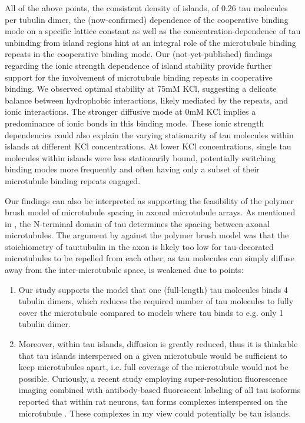 All of the above points, the consistent density of islands, of 0.26 tau molecules per tubulin dimer, the (now-confirmed) dependence of the cooperative binding mode on a specific lattice constant \parencite{siahaan2022microtubule} as well as the concentration-dependence of tau unbinding from island regions hint at an integral role of the microtubule binding repeats in the cooperative binding mode. Our (not-yet-published) findings regarding the ionic strength dependence of island stability  provide further support for the involvement of microtubule binding repeats in cooperative binding. We observed optimal stability at 75mM KCl, suggesting a delicate balance between hydrophobic interactions, likely mediated by the repeats, and ionic interactions. The stronger diffusive mode at 0mM KCl implies a predominance of ionic bonds in this binding mode. These ionic strength dependencies could also explain the varying stationarity of tau molecules within islands at different KCl concentrations. At lower KCl concentrations, single tau molecules within islands were less stationarily bound, potentially switching binding modes more frequently and often having only a subset of their microtubule binding repeats engaged.\par

Our findings can also be interpreted as supporting the feasibility of the polymer brush model of microtubule spacing in axonal microtubule arrays. As mentioned in , the N-terminal domain of tau determines the spacing between axonal microtubules. The argument by \cite{Gaspard} against the polymer brush model was that the stoichiometry of tau:tubulin in the axon is likely too low for tau-decorated microtubules to be repelled from each other, as tau molecules can simply diffuse away from the inter-microtubule space, is weakened due to points:
\begin{enumerate}
    \item Our study supports the model that one (full-length) tau molecules binds 4 tubulin dimers, which reduces the required number of tau molecules to fully cover the microtubule compared to models where tau binds to e.g. only 1 tubulin dimer.
    \item Moreover, within tau islands, diffusion is greatly reduced, thus it is thinkable that tau islands interspersed on a given microtubule would be sufficient to keep microtubules apart, i.e. full coverage of the microtubule would not be possible. Curiously, a recent study employing super-resolution fluorescence imaging combined with antibody-based fluorescent labeling of all tau isoforms reported that within rat neurons, tau forms complexes interspersed on the microtubule . These complexes in my view could potentially be tau islands.
\end{enumerate}

